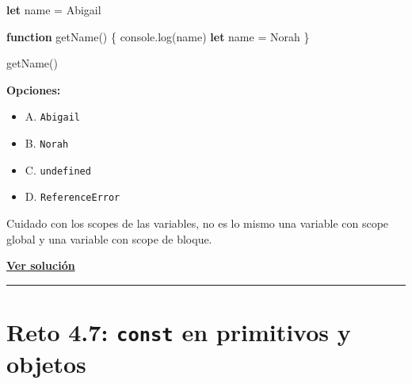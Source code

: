 \documentclass[
  letterpaper,
  DIV=11,
  numbers=noendperiod]{scrreprt}
\newenvironment{Shaded}{\begin{snugshade}}{\end{snugshade}}
\newcommand{\BuiltInTok}[1]{\textcolor[rgb]{0.00,0.23,0.31}{#1}}
\newcommand{\FunctionTok}[1]{\textcolor[rgb]{0.28,0.35,0.67}{#1}}
\newcommand{\KeywordTok}[1]{\textcolor[rgb]{0.00,0.23,0.31}{\textbf{#1}}}
\newcommand{\NormalTok}[1]{\textcolor[rgb]{0.00,0.23,0.31}{#1}}
\newcommand{\OperatorTok}[1]{\textcolor[rgb]{0.37,0.37,0.37}{#1}}
\newcommand{\StringTok}[1]{\textcolor[rgb]{0.13,0.47,0.30}{#1}}
\providecommand{\tightlist}{%
  \setlength{\itemsep}{0pt}\setlength{\parskip}{0pt}}
\begin{document}
\begin{Shaded}
\begin{Highlighting}[]
\KeywordTok{let}\NormalTok{ name }\OperatorTok{=} \StringTok{\textquotesingle{}Abigail\textquotesingle{}}

\KeywordTok{function} \FunctionTok{getName}\NormalTok{() \{}
  \BuiltInTok{console}\OperatorTok{.}\FunctionTok{log}\NormalTok{(name)}
  \KeywordTok{let}\NormalTok{ name }\OperatorTok{=} \StringTok{\textquotesingle{}Norah\textquotesingle{}}
\NormalTok{\}}

\FunctionTok{getName}\NormalTok{()}
\end{Highlighting}
\end{Shaded}

\textbf{Opciones:}

\begin{itemize}
\tightlist
\item
  A. \texttt{Abigail}
\item
  B. \texttt{Norah}
\item
  C. \texttt{undefined}
\item
  D. \texttt{ReferenceError}
\end{itemize}

\begin{tcolorbox}[enhanced jigsaw, left=2mm, toprule=.15mm, leftrule=.75mm, breakable, colback=white, coltitle=black, bottomtitle=1mm, arc=.35mm, rightrule=.15mm, colframe=quarto-callout-tip-color-frame, opacitybacktitle=0.6, toptitle=1mm, opacityback=0, titlerule=0mm, title=\textcolor{quarto-callout-tip-color}{\faLightbulb}\hspace{0.5em}{Pista}, bottomrule=.15mm, colbacktitle=quarto-callout-tip-color!10!white]

Cuidado con los scopes de las variables, no es lo mismo una variable con
scope global y una variable con scope de bloque.

\end{tcolorbox}

\textbf{\hyperref[sec-sol-cap4-reto6]{Ver solución}}

\begin{center}\rule{0.5\linewidth}{0.5pt}\end{center}

\section{\texorpdfstring{Reto 4.7: \texttt{const} en primitivos y
objetos}{Reto 4.7: const en primitivos y objetos}}\label{sec-cap4-reto7}
\end{document}
